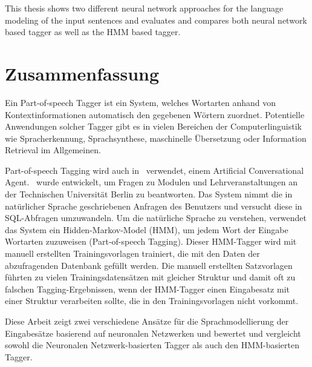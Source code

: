 This thesis shows two different neural network approaches for the language modeling of the input sentences and evaluates and compares both neural network based tagger as well as the HMM based tagger.

\BlankPage

\chapter*{Zusammenfassung}
Ein Part-of-speech Tagger ist ein System, welches Wortarten anhand von Kontextinformationen automatisch den gegebenen Wörtern zuordnet. Potentielle Anwendungen solcher Tagger gibt es in vielen Bereichen der Computerlinguistik wie Spracherkennung, Sprachsynthese, maschinelle Übersetzung oder Information Retrieval im Allgemeinen.

Part-of-speech Tagging wird auch in \Alex\ verwendet, einem Artificial Conversational Agent. \Alex\ wurde entwickelt, um Fragen zu Modulen und Lehrveranstaltungen an der Technischen Universität Berlin zu beantworten. Das System nimmt die in natürlicher Sprache geschriebenen Anfragen des Benutzers und versucht diese in SQL-Abfragen umzuwandeln. Um die natürliche Sprache zu verstehen, verwendet das System ein Hidden-Markov-Model (HMM), um jedem Wort der Eingabe Wortarten zuzuweisen (Part-of-speech Tagging). Dieser HMM-Tagger wird mit manuell erstellten Trainingsvorlagen trainiert, die mit den Daten der abzufragenden Datenbank gefüllt werden. Die manuell erstellten Satzvorlagen führten zu vielen Trainingsdatensätzen mit gleicher Struktur und damit oft zu falschen Tagging-Ergebnissen, wenn der HMM-Tagger einen Eingabesatz mit einer Struktur verarbeiten sollte, die in den Trainingsvorlagen nicht vorkommt.

Diese Arbeit zeigt zwei verschiedene Ansätze für die Sprachmodellierung der Eingabesätze basierend auf neuronalen Netzwerken und bewertet und vergleicht sowohl die Neuronalen Netzwerk-basierten Tagger als auch den HMM-basierten Tagger.

\BlankPage

\tableofcontents

\listoffigures

